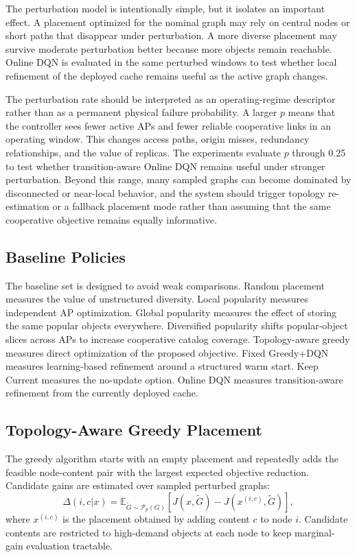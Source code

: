 The perturbation model is intentionally simple, but it isolates an important effect. A placement optimized for the nominal graph may rely on central nodes or short paths that disappear under perturbation. A more diverse placement may survive moderate perturbation better because more objects remain reachable. Online DQN is evaluated in the same perturbed windows to test whether local refinement of the deployed cache remains useful as the active graph changes.

The perturbation rate should be interpreted as an operating-regime descriptor rather than as a permanent physical failure probability. A larger \(p\) means that the controller sees fewer active APs and fewer reliable cooperative links in an operating window. This changes access paths, origin misses, redundancy relationships, and the value of replicas. The experiments evaluate \(p\) through 0.25 to test whether transition-aware Online DQN remains useful under stronger perturbation. Beyond this range, many sampled graphs can become dominated by disconnected or near-local behavior, and the system should trigger topology re-estimation or a fallback placement mode rather than assuming that the same cooperative objective remains equally informative.

\subsection{Baseline Policies}

The baseline set is designed to avoid weak comparisons. Random placement measures the value of unstructured diversity. Local popularity measures independent AP optimization. Global popularity measures the effect of storing the same popular objects everywhere. Diversified popularity shifts popular-object slices across APs to increase cooperative catalog coverage. Topology-aware greedy measures direct optimization of the proposed objective. Fixed Greedy+DQN measures learning-based refinement around a structured warm start. Keep Current measures the no-update option. Online DQN measures transition-aware refinement from the currently deployed cache.

\subsection{Topology-Aware Greedy Placement}

The greedy algorithm starts with an empty placement and repeatedly adds the feasible node-content pair with the largest expected objective reduction. Candidate gains are estimated over sampled perturbed graphs:
\[
\Delta(i,c|x)=
\mathbb{E}_{\tilde{G}\sim\mathcal{P}_p(G)}
\left[J(x,\tilde{G})-J(x^{(i,c)},\tilde{G})\right],
\]
where \(x^{(i,c)}\) is the placement obtained by adding content \(c\) to node \(i\). Candidate contents are restricted to high-demand objects at each node to keep marginal-gain evaluation tractable.

